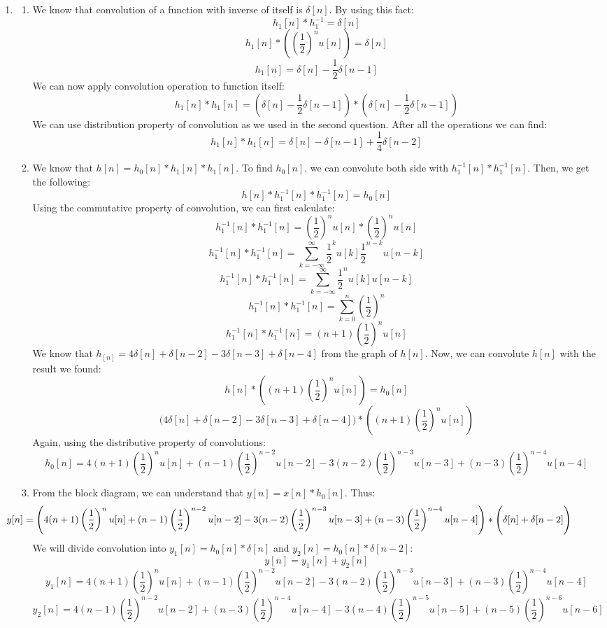\documentclass[10pt,a4paper, margin=1in]{article}
\begin{document}
\begin{enumerate}
\item %
    \begin{enumerate}   
    \item We know that convolution of a function with inverse of itself is $\delta[n]$. By using this fact:
    \[h_1[n] \ast h_1^{-1} = \delta[n]\]
    \[h_1[n] \ast ((\frac{1}{2})^n u[n]) =  \delta[n]\]
    \[h_1[n] = \delta[n] - \frac{1}{2}\delta[n-1]\]
    We can now apply convolution operation to function itself:
    \[h_1[n] \ast h_1[n] = (\delta[n] - \frac{1}{2}\delta[n-1]) \ast (\delta[n] - \frac{1}{2}\delta[n-1])\]
    We can use distribution property of convolution as we used in the second question. After all the operations we can find:
    \[h_1[n] \ast h_1[n] = \delta[n] - \delta[n-1] + \frac{1}{4}\delta[n-2]\]
    \item We know that $h[n] = h_0[n] \ast h_1[n] \ast h_1[n]$. To find $h_0[n]$, we can convolute both side with $h_1^{-1}[n] \ast h_1^{-1}[n]$. Then, we get the following:
    \[h[n] \ast h_1^{-1}[n] \ast h_1^{-1}[n] = h_0[n]\]
    Using the commutative property of convolution, we can first calculate:
    \[h_1^{-1}[n] \ast h_1^{-1}[n] = (\frac{1}{2})^n u[n] \ast (\frac{1}{2})^n u[n]\]
    \[h_1^{-1}[n] \ast h_1^{-1}[n] = \sum_{k = -\infty}^{\infty} \frac{1}{2}^k u[k] \frac{1}{2}^{n-k} u[n-k]\]
    \[h_1^{-1}[n] \ast h_1^{-1}[n] = \sum_{k = -\infty}^{\infty} \frac{1}{2}^n u[k] u[n-k]\]
    \[h_1^{-1}[n] \ast h_1^{-1}[n] = \sum_{k = 0}^{n} \left(\frac{1}{2}\right)^n\]
    \[h_1^{-1}[n] \ast h_1^{-1}[n] = (n+1)\left(\frac{1}{2}\right)^n u[n]\]
    We know that $h_[n] = 4\delta[n] + \delta[n-2] -3\delta[n-3] + \delta[n-4]$ from the graph of $h[n]$. Now, we can convolute $h[n]$ with the result we found:
    \[h[n] \ast ((n+1)\left(\frac{1}{2}\right)^n u[n]) = h_0[n]\]
    \[\bigg(4\delta[n] + \delta[n-2] -3\delta[n-3] + \delta[n-4]\bigg) \ast \left((n+1)\left(\frac{1}{2}\right)^n u[n]\right)\]
    Again, using the distributive property of convolutions:
    \[h_0[n] = 4(n+1)\left(\frac{1}{2}\right)^n u[n] + (n-1)\left(\frac{1}{2}\right)^{n-2} u[n-2] - 3(n-2)\left(\frac{1}{2}\right)^{n-3} u[n-3] + (n-3)\left(\frac{1}{2}\right)^{n-4} u[n-4]\]
    \item From the block diagram, we can understand that $y[n] = x[n] \ast h_0[n]$. Thus:
    \[\hspace{-20mm}y[n] = \left(4(n+1)\left(\frac{1}{2}\right)^n u[n] + (n-1)\left(\frac{1}{2}\right)^{n-2} u[n-2] - 3(n-2)\left(\frac{1}{2}\right)^{n-3} u[n-3] + (n-3)\left(\frac{1}{2}\right)^{n-4} u[n-4]\right) \ast \Bigg(\delta[n] + \delta[n-2]\Bigg)\]
    We will divide convolution into $y_1[n] = h_0[n] \ast \delta[n]$ and $y_2[n] = h_0[n] \ast \delta[n-2]$:
    \[y[n] = y_1[n] + y_2[n]\]
    \[y_1[n] = 4(n+1)\left(\frac{1}{2}\right)^n u[n] + (n-1)\left(\frac{1}{2}\right)^{n-2} u[n-2] - 3(n-2)\left(\frac{1}{2}\right)^{n-3} u[n-3] + (n-3)\left(\frac{1}{2}\right)^{n-4} u[n-4]\]
    \[y_2[n] = 4(n-1)\left(\frac{1}{2}\right)^{n-2} u[n-2] + (n-3)\left(\frac{1}{2}\right)^{n-4} u[n-4] - 3(n-4)\left(\frac{1}{2}\right)^{n-5} u[n-5] + (n-5)\left(\frac{1}{2}\right)^{n-6} u[n-6]\]
    \end{enumerate}


\end{enumerate}
\end{document}
